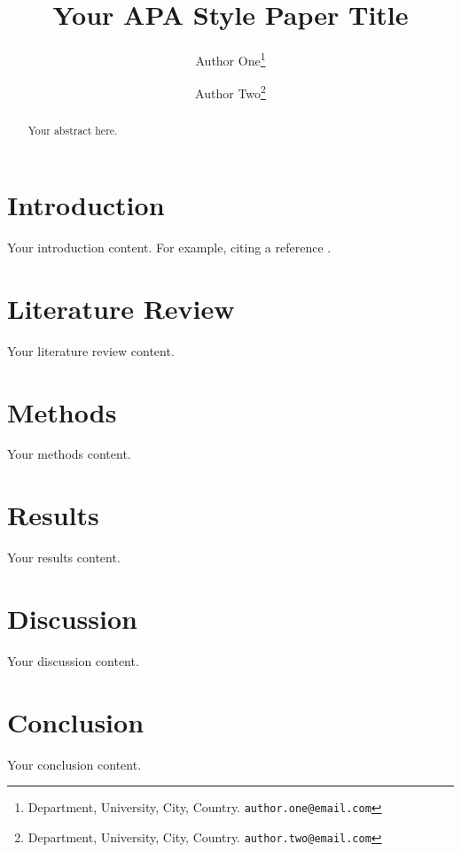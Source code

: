 \documentclass{article}
\title{Your APA Style Paper Title}
\author{Author One\thanks{Department, University, City, Country. \texttt{author.one@email.com}} \and Author Two\thanks{Department, University, City, Country. \texttt{author.two@email.com}}}
\date{}
\begin{document}
\maketitle

\begin{abstract}
Your abstract here.
\end{abstract}

\section{Introduction}
Your introduction content. For example, citing a reference \parencite{wang2012}.

\section{Literature Review}
Your literature review content.

\section{Methods}
Your methods content.

\section{Results}
Your results content.

\section{Discussion}
Your discussion content.

\section{Conclusion}
Your conclusion content.

\printbibliography
\end{document}
